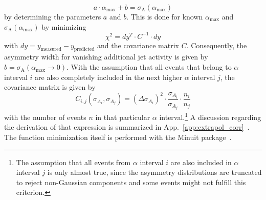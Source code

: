 \begin{equation}
 a \cdot \alpha_\mathrm{max} + b = \sigma_\mathrm{A}(\alpha_\mathrm{max})
\end{equation}
by determining the parameters $a$ and $b$. This is done for known $\alpha_\mathrm{max}$ and $\sigma_\mathrm{A}(\alpha_\mathrm{max})$ by minimizing 
\begin{equation}
\chi^2 = dy^T \cdot C^{-1} \cdot dy
\end{equation}
with $dy = y_{\mathrm{measured}} - y_{\mathrm{predicted}}$ and the covariance matrix $C$. Consequently, the asymmetry width for vanishing additional jet activity is given by $b=\sigma_\mathrm{A}(\alpha_\mathrm{max} \rightarrow 0)$. With the assumption that all events that belong to $\alpha$ interval $i$ are also completely included in the next higher $\alpha$ interval $j$, the covariance matrix is given by
\begin{equation}
C_{i,j}(\sigma_{A_i},\sigma_{A_j}) = (\Delta \sigma_{A_i})^2 \cdot \frac{\sigma_{A_i}}{\sigma_{A_j}} \cdot \frac{n_i}{n_j} 
\label{eq:jer_corr}
\end{equation}
with the number of events $n$ in that particular $\alpha$ interval.\footnote{The assumption that all events from $\alpha$ interval $i$ are also included in $\alpha$ interval $j$ is only almost true, since the asymmetry distributions are truncated to reject non-Gaussian components and some events might not fulfill this criterion.} A discussion regarding the derivation of that expression is summarized in App.~\ref{app:extrapol_corr}~\cite{JOtt}. The function minimization itself is performed with the Minuit package~\cite{Minuit}.    
